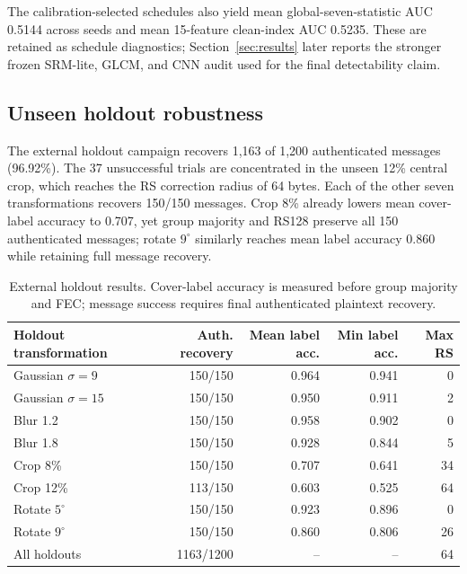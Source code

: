The calibration-selected schedules also yield mean global-seven-statistic AUC 0.5144 across seeds and mean 15-feature clean-index AUC 0.5235. These are retained as schedule diagnostics; Section~\ref{sec:results} later reports the stronger frozen SRM-lite, GLCM, and CNN audit used for the final detectability claim.

\subsection{Unseen holdout robustness}

The external holdout campaign recovers 1,163 of 1,200 authenticated messages (96.92\%). The 37 unsuccessful trials are concentrated in the unseen 12\% central crop, which reaches the RS correction radius of 64 bytes. Each of the other seven transformations recovers 150/150 messages. Crop 8\% already lowers mean cover-label accuracy to 0.707, yet group majority and RS128 preserve all 150 authenticated messages; rotate $9^\circ$ similarly reaches mean label accuracy 0.860 while retaining full message recovery.

\begin{table}[t]
\caption{External holdout results. Cover-label accuracy is measured before group majority and FEC; message success requires final authenticated plaintext recovery.}
\label{tab:holdout}
\small
\begin{tabular}{@{}lrrrr@{}}
\toprule
Holdout transformation & Auth. recovery & Mean label acc. & Min label acc. & Max RS \\
\midrule
Gaussian $\sigma=9$  & 150/150 & 0.964 & 0.941 & 0 \\
Gaussian $\sigma=15$ & 150/150 & 0.950 & 0.911 & 2 \\
Blur 1.2              & 150/150 & 0.958 & 0.902 & 0 \\
Blur 1.8              & 150/150 & 0.928 & 0.844 & 5 \\
Crop 8\%              & 150/150 & 0.707 & 0.641 & 34 \\
Crop 12\%             & 113/150 & 0.603 & 0.525 & 64 \\
Rotate $5^\circ$      & 150/150 & 0.923 & 0.896 & 0 \\
Rotate $9^\circ$      & 150/150 & 0.860 & 0.806 & 26 \\
\midrule
All holdouts           & 1163/1200 & -- & -- & 64 \\
\bottomrule
\end{tabular}
\end{table}

